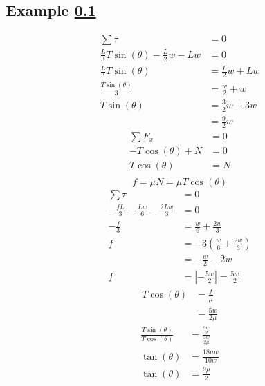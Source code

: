 \documentclass{article}
\begin{document}
\subsection{Example \ref{example:3}} \label{example:3}
\begin{align*}
	\sum \tau & = 0 \\
	\frac{L}{3}T\sin(\theta) - \frac{L}{2}w - Lw & = 0 \\
	\frac{L}{3}T\sin(\theta) & = \frac{L}{2}w + Lw \\
	\frac{T\sin(\theta)}{3} & = \frac{w}{2} + w \\
	T\sin(\theta) & = \frac{3}{2}w + 3w \\
				  & = \frac{9}{2}w
\end{align*}
\begin{align*}
	\sum F_x & = 0 \\
	-T\cos(\theta) + N & = 0 \\
	T\cos(\theta) & = N \\
\end{align*}
$$ f = \mu N = \mu T\cos(\theta) $$
\begin{align*}
	\sum \tau & = 0 \\
	-\frac{fL}{3} - \frac{Lw}{6} - \frac{2Lw}{3} & = 0 \\
	-\frac{f}{3} & = \frac{w}{6} + \frac{2w}{3} \\
	f & = -3 \left( \frac{w}{6} + \frac{2w}{3} \right) \\
	  & = -\frac{w}{2} - 2w \\
	f & = \left| -\frac{5w}{2} \right| = \frac{5w}{2}
\end{align*}
\begin{align*}
	T\cos(\theta) & = \frac{f}{\mu} \\
				  & = \frac{5w}{2\mu}
\end{align*}
\begin{align*}
	\frac{T\sin(\theta)}{T\cos(\theta)} & = \frac{\frac{9w}{2}}{\frac{5w}{2\mu}} \\
	\tan(\theta) & = \frac{18\mu w}{10w} \\
	\tan(\theta) & = \frac{9\mu}{2}
\end{align*}
\end{document}
